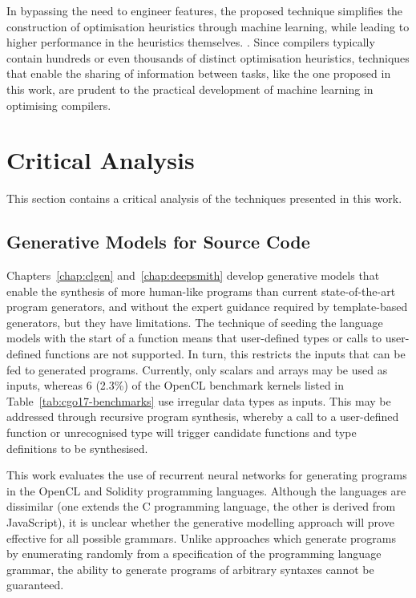 In bypassing the need to engineer features, the proposed technique simplifies the construction of optimisation heuristics through machine learning, while leading to higher performance in the heuristics themselves. . Since compilers typically contain hundreds or even thousands of distinct optimisation heuristics, techniques that enable the sharing of information between tasks, like the one proposed in this work, are prudent to the practical development of machine learning in optimising compilers.


\section{Critical Analysis}
\label{sec:conclusions-critical-analysis}

This section contains a critical analysis of the techniques presented in this work.


\subsection{Generative Models for Source Code}

Chapters~\ref{chap:clgen} and~\ref{chap:deepsmith} develop generative models that enable the synthesis of more human-like programs than current state-of-the-art program generators, and without the expert guidance required by template-based generators, but they have limitations. The technique of seeding the language models with the start of a function means that user-defined types or calls to user-defined functions are not supported. In turn, this restricts the inputs that can be fed to generated programs. Currently, only scalars and arrays may be used as inputs, whereas 6 (2.3\%) of the OpenCL benchmark kernels listed in Table~\ref{tab:cgo17-benchmarks} use irregular data types as inputs. This may be addressed through recursive program synthesis, whereby a call to a user-defined function or unrecognised type will trigger candidate functions and type definitions to be synthesised.

This work evaluates the use of recurrent neural networks for generating programs in the OpenCL and Solidity programming languages. Although the languages are dissimilar (one extends the C programming language, the other is derived from JavaScript), it is unclear whether the generative modelling approach will prove effective for all possible grammars. Unlike approaches which generate programs by enumerating randomly from a specification of the programming language grammar, the ability to generate programs of arbitrary syntaxes cannot be guaranteed.

